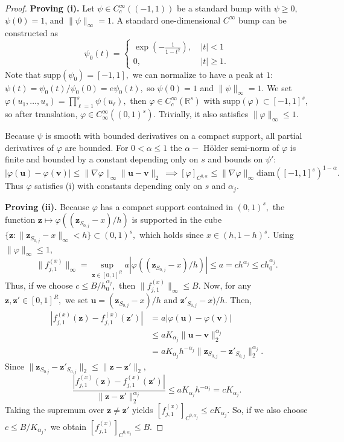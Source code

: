 \documentclass[11pt]{article}
\newcommand{\bz}{\bm{z}}
\theoremstyle{plain}
\theoremstyle{definition}
\theoremstyle{plain}
\begin{document}
\begin{proof}
\textbf{Proving (i).} Let $\psi\in C^\infty_c((-1,1))$ be a standard bump with $\psi\ge 0$, $\psi(0)=1$, and $\|\psi\|_\infty=1$. A standard one-dimensional $C^{\infty}$ bump can be constructed as \[
\psi_0(t) = \begin{cases}
\exp \left(-\frac{1}{1-t^2} \right), & \ |t|<1 \\
0, & \ |t| \ge 1.
\end{cases}
\]
Note that $\textrm{supp}(\psi_0)=[-1,1],$ we can normalize to have a peak at $1$: $\psi(t) = \psi_0(t)/\psi_0(0) = e \psi_0(t),$ so $\psi(0)=1$ and $\|\psi\|_{\infty}=1.$ We set
\(
\varphi(u_1,\dots,u_s)=\prod_{\ell=1}^s \psi(u_\ell),
\)
then $\varphi \in C^{\infty} _c (\mathbb{R}^s)$ with $\textrm{supp}(\varphi) \subset [-1,1]^s,$ so after translation, $\varphi \in C^{\infty} _{\infty}((0,1)^s)$. Trivially, it also satisfies $\|\varphi\|_{\infty} \le 1.$

Because $\psi$ is smooth with bounded derivatives on a compact support, all partial derivatives of $\varphi$ are bounded. For $0<\alpha \le 1$ the $\alpha-$ H\"older semi-norm of $\varphi$ is finite and bounded by a constant depending only on $s$ and bounds on $\psi':$
\[
|\varphi(\bm{u})-\varphi(\bm{v})| \le \| \nabla \varphi \|_{\infty} \| \bm{u}-\bm{v} \|_{2} \ \implies [\varphi]_{C^{0,\alpha}} \le \|\nabla \varphi\|_{\infty} \text{diam}([-1,1]^s)^{1-\alpha}.
\]
Thus $\varphi$ satisfies (i) with constants depending only on $s$ and $\alpha_j$.

\textbf{Proving (ii).} Because $\varphi$ has a compact support contained in $(0,1)^s,$ the function $\bz \mapsto \varphi((\bz_{S_{0,j}}-x)/h)$ is supported in the cube $\{\bz : \|\bz_{S_{0,j}}-x\|_{\infty} < h\} \subset (0,1)^s,$ which holds since $x \in (h,1-h)^s.$ Using $\|\varphi\|_{\infty} \le 1,$
\[
\|f_{j,1}^{(x)}\|_{\infty} = \sup_{\bz \in [0,1]^R} a| \varphi((\bz_{S_{0,j}}-x)/h)| \le a = ch^{\alpha_j} \le ch_0 ^{\alpha_j}.
\]
Thus, if we choose $c \le B/h_0 ^{\alpha_j},$ then $\|f_{j,1} ^{(x)}\|_{\infty} \le B.$ Now, for any $\bz,\bz' \in [0,1]^R,$ we set $\bm{u}=(\bz_{S_{0,j}}-x)/h$ and $\bz'_{S_{0,j}}-x)/h.$ Then, 
\begin{align*}
    \left|f_{j,1}^{(x)}(\bz)-f_{j,1} ^{(x)}(\bz')\right| & = a | \varphi(\bm{u})-\varphi(\bm{v})| \\
    & \le a K_{\alpha_j} \|\bm{u}-\bm{v}\|_{2} ^{\alpha_j} \\
    & = a K_{\alpha_j} h^{-\alpha_j} \|\bz_{S_{0,j}} - \bz' _{S_{0,j}} \|_2 ^{\alpha_j}.
\end{align*}
Since $\|\bz_{S_{0.j}}-\bz'_{S_{0,j}}\|_2 \le \| \bz-\bz'\|_2,$ 
\[
\frac{\left| f_{j,1} ^{(x)} (\bz)-f_{j,1}^{(x)} (\bz') \right|}{\|\bz-\bz'\|_2 ^{\alpha_j}} \le a K_{\alpha_j} h^{-\alpha_j} = c K_{\alpha_j}.
\]
Taking the supremum over $\bz \neq \bz'$ yields $\left[f_{j,1} ^{(x)} \right]_{C^{0,\alpha_j}} \le c K_{\alpha_j}.$ So, if we also choose $c \le B/K_{\alpha_j},$ we obtain $\left[f_{j,1}^{(x)}\right]_{C^{0,\alpha_j}} \le B.$


\end{proof}
\end{document}
